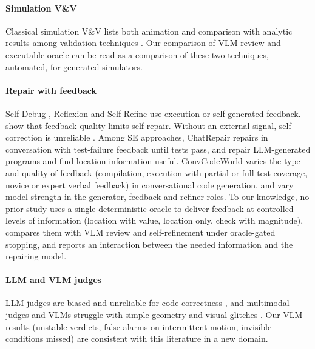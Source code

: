 \paragraph{Simulation V\&V} Classical simulation V\&V lists both animation and comparison with analytic results among validation techniques \citep{sargent2013vv,balci1997vva,kleijnen1995vv}. Our comparison of VLM review and executable oracle can be read as a comparison of these two techniques, automated, for generated simulators.

\paragraph{Repair with feedback} Self-Debug \citep{chen2023selfdebug}, Reflexion \citep{shinn2023reflexion} and Self-Refine \citep{madaan2023selfrefine} use execution or self-generated feedback. \citet{olausson2024selfrepair} show that feedback quality limits self-repair. Without an external signal, self-correction is unreliable \citep{huang2024cannot,kamoi2024selfcorrection}. Among SE approaches, ChatRepair \citep{xia2024chatrepair} repairs in conversation with test-failure feedback until tests pass, and \citet{fan2023repairllm} repair LLM-generated programs and find location information useful. ConvCodeWorld \citep{han2025convcodeworld} varies the type and quality of feedback (compilation, execution with partial or full test coverage, novice or expert verbal feedback) in conversational code generation, and \citet{pan2025gfr} vary model strength in the generator, feedback and refiner roles. To our knowledge, no prior study uses a single deterministic oracle to deliver feedback at controlled levels of information (location with value, location only, check with magnitude), compares them with VLM review and self-refinement under oracle-gated stopping, and reports an interaction between the needed information and the repairing model.

\paragraph{LLM and VLM judges} LLM judges are biased and unreliable for code correctness \citep{zheng2023judging,wang2024notfair,crupi2025llmjudgecode}, and multimodal judges and VLMs struggle with simple geometry and visual glitches \citep{chen2024mllmjudge,rahmanzadehgervi2024blind,taesiri2024glitchbench}. Our VLM results (unstable verdicts, false alarms on intermittent motion, invisible conditions missed) are consistent with this literature in a new domain.

